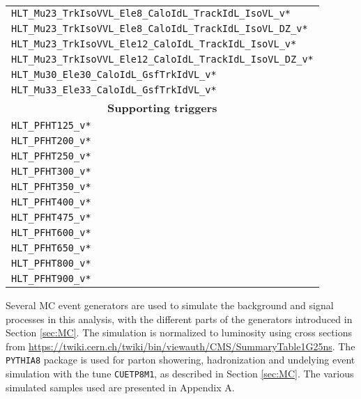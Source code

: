 \begin{table}[ht!]
\begin{center}
\begin{tabular}{ l}
        \texttt{HLT\_Mu23\_TrkIsoVVL\_Ele8\_CaloIdL\_TrackIdL\_IsoVL\_v*}    \\ 
        \texttt{HLT\_Mu23\_TrkIsoVVL\_Ele8\_CaloIdL\_TrackIdL\_IsoVL\_DZ\_v*} \\
        \texttt{HLT\_Mu23\_TrkIsoVVL\_Ele12\_CaloIdL\_TrackIdL\_IsoVL\_v*}    \\ 
        \texttt{HLT\_Mu23\_TrkIsoVVL\_Ele12\_CaloIdL\_TrackIdL\_IsoVL\_DZ\_v*}    \\ 
        \texttt{HLT\_Mu30\_Ele30\_CaloIdL\_GsfTrkIdVL\_v*}            \\
        \texttt{HLT\_Mu33\_Ele33\_CaloIdL\_GsfTrkIdVL\_v*}            \\
        \hline 
        \multicolumn{1}{c}{\textbf{Supporting triggers}} \\
        \hline 
        \texttt{HLT\_PFHT125\_v*}                       \\
        \texttt{HLT\_PFHT200\_v*}                       \\
        \texttt{HLT\_PFHT250\_v*}                       \\
        \texttt{HLT\_PFHT300\_v*}                       \\
        \texttt{HLT\_PFHT350\_v*}                       \\
        \texttt{HLT\_PFHT400\_v*}                       \\
        \texttt{HLT\_PFHT475\_v*}                       \\
        \texttt{HLT\_PFHT600\_v*}                       \\
        \texttt{HLT\_PFHT650\_v*}                       \\
        \texttt{HLT\_PFHT800\_v*}                       \\
        \texttt{HLT\_PFHT900\_v*}                       \\
\hline\hline
\end{tabular}
\end{center}
\end{table}                                                                                                          

Several MC event generators are used to simulate the background and signal processes in this analysis, with the different parts of the generators introduced in Section \ref{sec:MC}. 
The simulation is normalized to luminosity using cross sections from \url{https://twiki.cern.ch/twiki/bin/viewauth/CMS/SummaryTable1G25ns}.
The \texttt{PYTHIA8} \cite{Sjostrand:2006za} package is used for parton showering, hadronization and undelying event simulation with the tune \texttt{CUETP8M1}, as described in Section \ref{sec:MC}.
The various simulated samples used are presented in Appendix A.  

